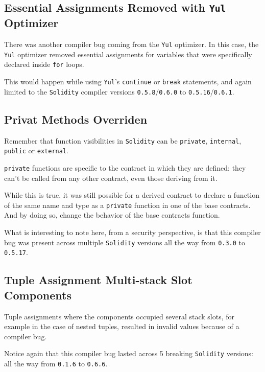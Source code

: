\subsection{\texorpdfstring{Essential Assignments Removed with
\texttt{Yul}
Optimizer}{Essential Assignments Removed with Yul Optimizer}}\label{essential-assignments-removed-with-yul-optimizer}

There was another compiler bug coming from the \texttt{Yul} optimizer.
In this case, the \texttt{Yul} optimizer removed essential assignments
for variables that were specifically declared inside \texttt{for} loops.

This would happen while using \texttt{Yul}'s \texttt{continue} or
\texttt{break} statements, and again limited to the \texttt{Solidity}
compiler versions \texttt{0.5.8}/\texttt{0.6.0} to
\texttt{0.5.16}/\texttt{0.6.1}.

\subsection{Privat Methods Overriden}\label{privat-methods-overriden}

Remember that function visibilities in \texttt{Solidity} can be
\texttt{private}, \texttt{internal}, \texttt{public} or
\texttt{external}.

\texttt{private} functions are specific to the contract in which they
are defined: they can't be called from any other contract, even those
deriving from it.

While this is true, it was still possible for a derived contract to
declare a function of the same name and type as a \texttt{private}
function in one of the base contracts. And by doing so, change the
behavior of the base contracts function.

What is interesting to note here, from a security perspective, is that
this compiler bug was present across multiple \texttt{Solidity} versions
all the way from \texttt{0.3.0} to \texttt{0.5.17}.

\subsection{Tuple Assignment Multi-stack Slot
Components}\label{tuple-assignment-multi-stack-slot-components}

Tuple assignments where the components occupied several stack slots, for
example in the case of nested tuples, resulted in invalid values because
of a compiler bug.

Notice again that this compiler bug lasted across 5 breaking
\texttt{Solidity} versions: all the way from \texttt{0.1.6} to
\texttt{0.6.6}.

